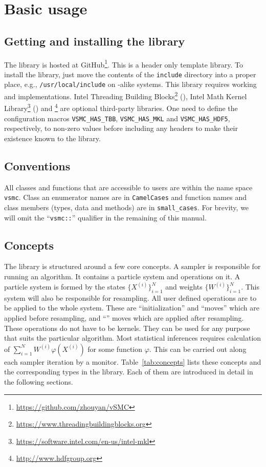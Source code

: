 \chapter{Basic usage}
\label{chap:Basic usage}

\section{Getting and installing the library}
\label{sec:Getting and installing the library}

The library is hosted at
GitHub\footnote{\url{https://github.com/zhouyan/vSMC}}. This is a header only
\cpp template library. To install the library, just move the contents of the
\verb|include| directory into a proper place, e.g., \verb|/usr/local/include|
on \unix-alike systems. This library requires working \cppoo and \blas
implementations. Intel Threading Building
Blocks\footnote{\url{https://www.threadingbuildingblocks.org}} (\tbb), Intel
Math Kernel Library\footnote{\url{https://software.intel.com/en-us/intel-mkl}}
(\mkl) and \hdf\footnote{\url{http://www.hdfgroup.org}} are optional
third-party libraries. One need to define the configuration macros
\verb|VSMC_HAS_TBB|, \verb|VSMC_HAS_MKL| and \verb|VSMC_HAS_HDF5|,
respectively, to non-zero values before including any \vsmc headers to make
their existence known to the library.

\section{Conventions}
\label{sec:Conventions}

All classes and functions that are accessible to users are within the name
space \verb|vsmc|. Class an enumerator names are in \verb|CamelCases| and
function names and class members (types, data and methods) are in
\verb|small_cases|. For brevity, we will omit the ``\verb|vsmc::|'' qualifier
in the remaining of this manual.

\section{Concepts}
\label{sec:Concepts}

The library is structured around a few core concepts. A sampler is responsible
for running an algorithm. It contains a particle system and operations on it. A
particle system is formed by the states $\{X^{(i)}\}_{i=1}^N$ and weights
$\{W^{(i)}\}_{i=1}^N$. This system will also be responsible for resampling. All
user defined operations are to be applied to the whole system. These are
``initialization'' and ``moves'' which are applied before resampling, and
``\mcmc'' moves which are applied after resampling. These operations do not
have to be \mcmc kernels. They can be used for any purpose that suits the
particular algorithm. Most statistical inferences requires calculation of
$\sum_{i=1}^NW^{(i)}\varphi(X^{(i)})$ for some function $\varphi$. This can be
carried out along each sampler iteration by a monitor. Table~\ref{tab:concepts}
lists these concepts and the corresponding types in the library. Each of them
are introduced in detail in the following sections.

